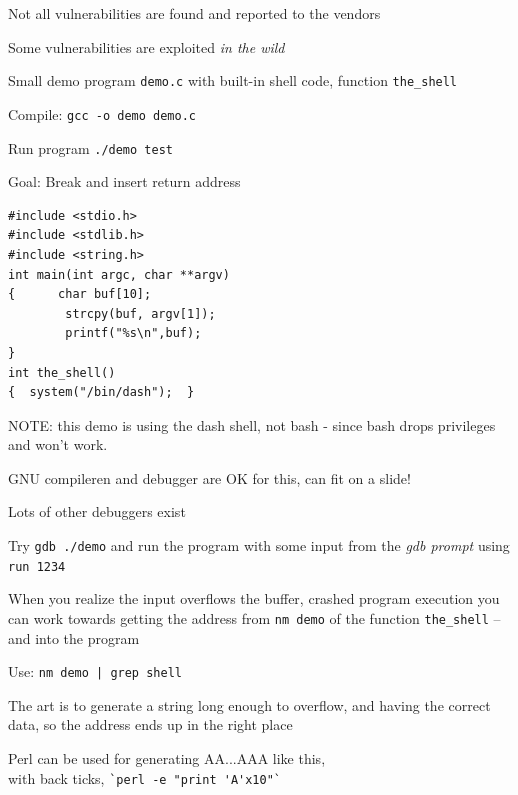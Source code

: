 \documentclass[Screen16to9,17pt]{foils}
\begin{document}
\begin{list2}
\item Not all vulnerabilities are found and reported to the vendors
\item Some vulnerabilities are exploited \emph{in the wild}
\end{list2}



\begin{list2}
\item Small demo program \verb+demo.c+ with built-in shell code, function \verb+the_shell+
\item Compile:
\verb+gcc -o demo demo.c+
\item Run program
\verb+./demo test+
\item Goal: Break and insert return address
\end{list2}

\begin{verbatim}
#include <stdio.h>
#include <stdlib.h>
#include <string.h>
int main(int argc, char **argv)
{      char buf[10];
        strcpy(buf, argv[1]);
        printf("%s\n",buf);
}
int the_shell()
{  system("/bin/dash");  }
\end{verbatim}

NOTE: this demo is using the dash shell, not bash - since bash drops privileges and won't work.


\begin{list1}
\item GNU compileren and debugger are OK for this, can fit on a slide!
\item Lots of other debuggers exist
\item Try \verb+gdb ./demo+ and run the program with some input from the \emph{gdb prompt}
using \verb+run 1234+
\item When you realize the input overflows the buffer, crashed program execution you can work towards getting the address from \verb+nm demo+ of the function \verb+the_shell+
   -- and into the program
\item Use: \verb+nm demo | grep shell+
\item The art is to generate a string long enough to overflow, and having the correct data, so the address ends up in the right place
\item Perl can be used for generating AA...AAA like this, \\
with back ticks, \verb+`perl -e "print 'A'x10"`+
\end{list1}
\end{document}
